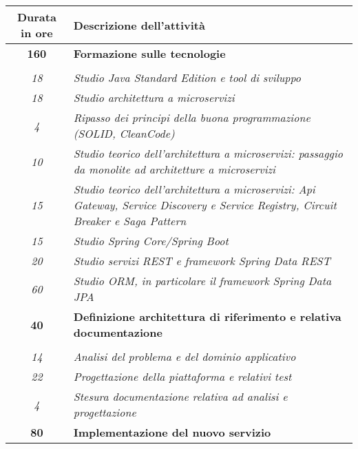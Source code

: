 

\begin{tabularx}{\textwidth}{|c|X|}
	\hline
	\textbf{Durata in ore} & \textbf{Descrizione dell'attività} \\\hline
	
	\textbf{160} & \textbf{Formazione sulle tecnologie} \\ \hdashline 
    \multirow{7}{0cm}\\ 
    \textit{18} & 
    \textit{Studio Java Standard Edition e tool di sviluppo} \\
    \textit{18} & 
    \textit{Studio architettura a microservizi} \\
    \textit{4} & 
    \textit{Ripasso dei principi della buona programmazione (SOLID, CleanCode)} \\


    \textit{10} & 
    \textit{Studio teorico dell’architettura a microservizi: passaggio da monolite ad architetture a microservizi} \\
    \textit{15} & 
    \textit{Studio teorico dell’architettura a microservizi: Api Gateway, Service Discovery e Service Registry, Circuit Breaker e Saga Pattern} \\
    \textit{15} & 
    \textit{Studio Spring Core/Spring Boot} \\

    
    \textit{20} & 
    \textit{Studio servizi REST e framework Spring Data REST} \\

    \textit{60} &
    \textit{Studio ORM, in particolare il framework Spring Data JPA} \\

    \hline
    
    \textbf{40} & \textbf{Definizione architettura di riferimento e relativa documentazione} \\ \hdashline 
    \multirow{3}{0cm}\\ 
    \textit{14} & 
    \textit{Analisi del problema e del dominio applicativo} \\
    \textit{22} & 
    \textit{Progettazione della piattaforma e relativi test} \\
    \textit{4} & 
    \textit{Stesura documentazione relativa ad analisi e progettazione} \\
    \hline
    \textbf{80} & \textbf{Implementazione del nuovo servizio} \\ 
    \hline
    

\end{tabularx}
